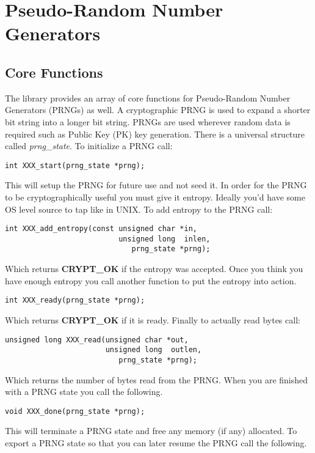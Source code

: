 \documentclass[synpaper]{book}
\newcommand{\mysection}[1]    %
	{                   %
	\section{#1}
   \markboth{\textsf{www.libtom.net}}{\thesection ~ {#1}}
	}
\begin{document}
\chapter{Pseudo-Random Number Generators}
\mysection{Core Functions}
The library provides an array of core functions for Pseudo-Random Number Generators (PRNGs) as well.  A cryptographic PRNG is
used to expand a shorter bit string into a longer bit string.  PRNGs are used wherever random data is required such as Public Key (PK)
key generation.  There is a universal structure called \textit{prng\_state}.  To initialize a PRNG call:
\begin{verbatim}
int XXX_start(prng_state *prng);
\end{verbatim}

This will setup the PRNG for future use and not seed it.  In order for the PRNG to be cryptographically useful you must give it
entropy.  Ideally you'd have some OS level source to tap like in UNIX.  To add entropy to the PRNG call:
\begin{verbatim}
int XXX_add_entropy(const unsigned char *in,
                          unsigned long  inlen,
                             prng_state *prng);
\end{verbatim}
Which returns {\bf CRYPT\_OK} if the entropy was accepted.  Once you think you have enough entropy you call another
function to put the entropy into action.
\begin{verbatim}
int XXX_ready(prng_state *prng);
\end{verbatim}

Which returns {\bf CRYPT\_OK} if it is ready.  Finally to actually read bytes call:
\begin{verbatim}
unsigned long XXX_read(unsigned char *out,
                       unsigned long  outlen,
                          prng_state *prng);
\end{verbatim}

Which returns the number of bytes read from the PRNG.  When you are finished with a PRNG state you call
the following.

\begin{verbatim}
void XXX_done(prng_state *prng);
\end{verbatim}

This will terminate a PRNG state and free any memory (if any) allocated.  To export a PRNG state
so that you can later resume the PRNG call the following.
\end{document}
